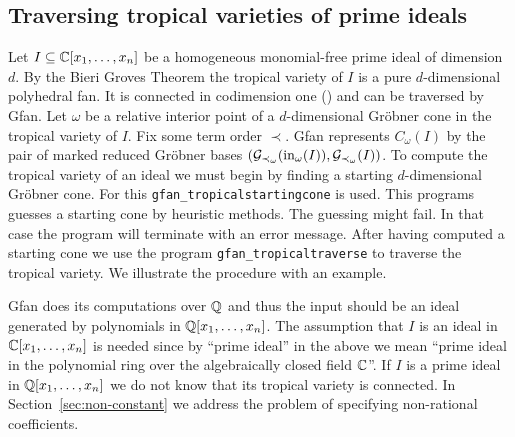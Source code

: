 \subsection{Traversing tropical varieties of prime ideals}
Let $I\subseteq \mathbb{C}[x_1,\dots,x_n]$ be a homogeneous monomial-free
prime ideal of dimension $d$. By the Bieri Groves Theorem \cite{bg}
the tropical variety of $I$ is a pure $d$-dimensional polyhedral
fan. It is connected in codimension one (\cite[Theorem~14]{ctv}) and can be
traversed by Gfan. Let $\omega$ be a relative interior point of a
$d$-dimensional Gr\"obner cone in the tropical variety of $I$. Fix
some term order $\prec$. Gfan represents $C_\omega(I)$ by the pair of
marked reduced Gr\"obner bases
$(\mathcal{G}_{\prec_\omega}(\textup{in}_\omega(I)),\mathcal{G}_{\prec_\omega}(I))$.  To
compute the tropical variety of an ideal we must begin by finding a
starting $d$-dimensional Gr\"obner cone. For this
\texttt{gfan\_tropicalstartingcone} is used. This programs guesses a
starting cone by heuristic methods. The guessing might fail. In that
case the program will terminate with an error message.  After having
computed a starting cone we use the program
\texttt{gfan\_tropicaltraverse} to traverse the tropical variety.
We illustrate the procedure with an example.
\begin{remark}
Gfan does its computations over $\mathbb{Q}$ and thus the input should be an
ideal generated by polynomials in $\mathbb{Q}[x_1,\dots,x_n]$. The assumption
that $I$ is an ideal in $\mathbb{C}[x_1,\dots,x_n]$ is needed since by
``prime ideal'' in the above we mean ``prime ideal in the polynomial
ring over the algebraically closed field $\mathbb{C}$''. If $I$ is a prime ideal in
$\mathbb{Q}[x_1,\dots,x_n]$ we do not know that its tropical variety is connected.
 In
Section~\ref{sec:non-constant} we address the problem of specifying non-rational
coefficients.
\end{remark}

